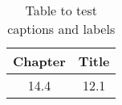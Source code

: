 \begin{table}[h!]
\centering
\begin{tabular}{cc}
{Chapter} & {Title} \\ 
\hline
{14.4} & {12.1}\\
\end{tabular}
\caption{Table to test captions and labels}
\label{table:1}
\end{table}